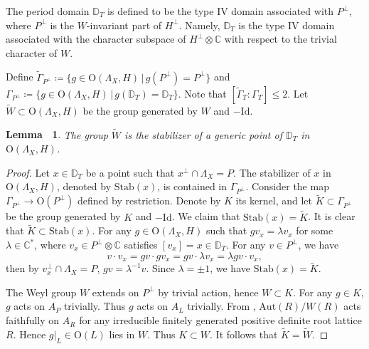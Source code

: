 \documentclass[12pt,reqno,a4paper]{amsart}
\newtheorem{lem}[thm]{Lemma~}
\theoremstyle{remark}
\theoremstyle{definition}
\newcommand{\CC}{\mathbb{C}}
\newcommand{\DD}{\mathbb{D}}
\newcommand\Aut{\mathrm{Aut}}
\newcommand\PO{\mathrm{PO}}
\newcommand\Id{\mathrm{Id}}
\newcommand\Or{\mathrm{O}}
\newcommand\Stab{\mathrm{Stab}}
\begin{document}
The period domain $\DD_T$ is defined to be the type IV domain associated with $P^\perp$, where $P^\perp$ is the $W$-invariant part of $H^{\perp}$.
Namely, $\DD_T$ is the type IV domain associated with the character subspace of $H^\perp\otimes\CC$ with respect to the trivial character of $W$.

Define $\widetilde\Gamma_{P^\perp}\coloneqq\{ g\in\Or(\Lambda_X,H) \,\big|\, g(P^\perp)=P^\perp \}$ and $\Gamma_{P^\perp}\coloneqq\{ g\in\Or(\Lambda_X,H) \,\big|\, g(\DD_T)=\DD_T \}$.
Note that $[\widetilde{\Gamma}_T:\Gamma_T]\le 2$.
Let $\widetilde{W}\subset\Or(\Lambda_X,H)$ be the group generated by $W$ and $-\Id$.
\begin{lem}
\label{lem: Stab(x) = W}
    The group $\widetilde{W}$ is the stabilizer of a generic point of $\DD_T$ in $\Or(\Lambda_X,H)$.
\end{lem}
\begin{proof}
    Let $x\in\DD_T$ be a point such that $x^\perp\cap\Lambda_X=P$.
    The stabilizer of $x$ in $\Or(\Lambda_X,H)$, denoted by $\Stab(x)$, is contained in $\Gamma_{P^\perp}$.
    Consider the map $\Gamma_{P^\perp}\to\Or(P^\perp)$ defined by restriction.
    Denote by $K$ its kernel, and let $\widetilde{K}\subset\Gamma_{P^\perp}$ be the group generated by $K$ and $-\Id$.
    We claim that $\Stab(x)=\widetilde{K}$. 
    It is clear that $\widetilde{K}\subset\Stab(x)$.
    For any $g\in\Or(\Lambda_X,H)$ such that $g v_x=\lambda v_x$ for some $\lambda\in\CC^*$, where $v_x\in P^\perp\otimes\CC$ satisfies $[v_x]=x\in\DD_T$.
    For any $v\in P^\perp$, we have
    \begin{equation*}
        v\cdot v_x = g v\cdot g v_x = g v\cdot \lambda v_x = \lambda g v\cdot v_x,
    \end{equation*}
    then by $v_x^\perp\cap\Lambda_X=P$, $g v=\lambda^{-1}v$.
    Since $\lambda=\pm1$, we have $\Stab(x)=\widetilde{K}$.
    
    The Weyl group $W$ extends on $P^\perp$ by trivial action, hence $W\subset K$.
    For any $g\in K$, $g$ acts on $A_P$ trivially.
    Thus $g$ acts on $A_L$ trivially.
    From \cite[PLATE I--X]{bourbaki2002lie4-6}, $\Aut(R)/W(R)$ acts faithfully on $A_R$ for any irreducible finitely generated positive definite root lattice $R$.
    Hence $g|_L\in\Or(L)$ lies in $W$.
    Thus $K\subset W$. It follows that $\widetilde{K}=\widetilde{W}$.
\end{proof}
\end{document}
